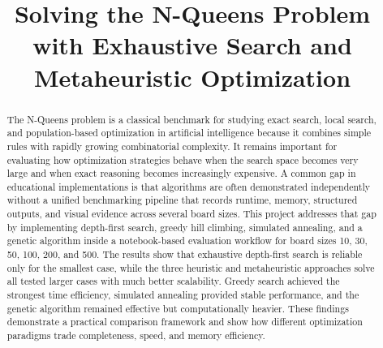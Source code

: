 \documentclass[conference]{IEEEtran}
\begin{document}
\title{Solving the N-Queens Problem with Exhaustive Search and Metaheuristic Optimization\\
}

\author{
\and
{}
}

\maketitle

\begin{abstract}
The N-Queens problem is a classical benchmark for studying exact search, local search, and population-based optimization in artificial intelligence because it combines simple rules with rapidly growing combinatorial complexity. It remains important for evaluating how optimization strategies behave when the search space becomes very large and when exact reasoning becomes increasingly expensive. A common gap in educational implementations is that algorithms are often demonstrated independently without a unified benchmarking pipeline that records runtime, memory, structured outputs, and visual evidence across several board sizes. This project addresses that gap by implementing depth-first search, greedy hill climbing, simulated annealing, and a genetic algorithm inside a notebook-based evaluation workflow for board sizes 10, 30, 50, 100, 200, and 500. The results show that exhaustive depth-first search is reliable only for the smallest case, while the three heuristic and metaheuristic approaches solve all tested larger cases with much better scalability. Greedy search achieved the strongest time efficiency, simulated annealing provided stable performance, and the genetic algorithm remained effective but computationally heavier. These findings demonstrate a practical comparison framework and show how different optimization paradigms trade completeness, speed, and memory efficiency.
\end{abstract}
\end{document}
